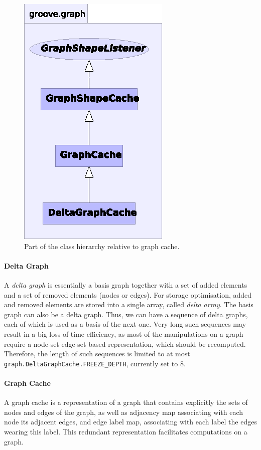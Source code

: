 \begin{figure}[ht]
  \centering
  \includegraphics{fig/caches}
  \caption{Part of the class hierarchy relative to graph cache.}
\end{figure}

\paragraph{Delta Graph}
A {\em delta graph} is essentially a basis graph together with a set of
added elements and a set of removed elements (nodes or edges). For storage
optimisation, added and removed elements are stored into a single array,
called {\em delta array}. The basis graph can also be a delta graph.  Thus,
we can have a sequence of delta graphs, each of which is used as a basis of
the next one. Very long such sequences may result in a big loss of time
efficiency, as most of the manipulations on a graph require a node-set
edge-set based representation, which should be recomputed. Therefore, the
length of such sequences is limited to at most {\tt
  graph.DeltaGraphCache.FREEZE\_DEPTH}, currently set to $8$.

\paragraph{Graph Cache}
A graph cache is a representation of a graph that contains explicitly the
sets of nodes and edges of the graph, as well as adjacency map associating
with each node its adjacent edges, and edge label map, associating with
each label the edges wearing this label. This redundant representation
facilitates computations on a graph. 


